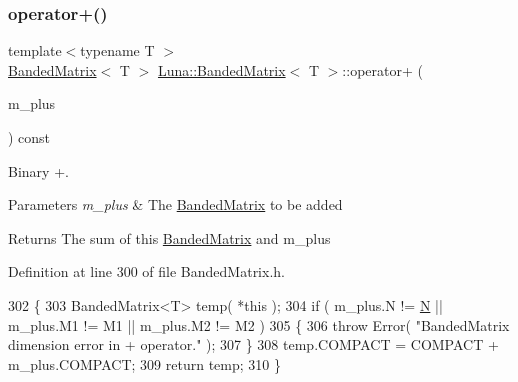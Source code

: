\subsubsection{\texorpdfstring{operator+()}{operator+()}\hspace{0.1cm}{\footnotesize\ttfamily [2/2]}}
{\footnotesize\ttfamily template$<$typename T $>$ \\
\hyperlink{classLuna_1_1BandedMatrix}{Banded\+Matrix}$<$ T $>$ \hyperlink{classLuna_1_1BandedMatrix}{Luna\+::\+Banded\+Matrix}$<$ T $>$\+::operator+ (\begin{DoxyParamCaption}\item[{const \hyperlink{classLuna_1_1BandedMatrix}{Banded\+Matrix}$<$ T $>$ \&}]{m\+\_\+plus }\end{DoxyParamCaption}) const\hspace{0.3cm}{\ttfamily [inline]}}



Binary +. 


\begin{DoxyParams}{Parameters}
{\em m\+\_\+plus} & The \hyperlink{classLuna_1_1BandedMatrix}{Banded\+Matrix} to be added \\
\hline
\end{DoxyParams}
\begin{DoxyReturn}{Returns}
The sum of this \hyperlink{classLuna_1_1BandedMatrix}{Banded\+Matrix} and m\+\_\+plus 
\end{DoxyReturn}


Definition at line 300 of file Banded\+Matrix.\+h.


\begin{DoxyCode}
302   \{
303     BandedMatrix<T> temp( *\textcolor{keyword}{this} );
304     \textcolor{keywordflow}{if} ( m\_plus.N != \hyperlink{namespaceHeat__plot_a7d050092798e28458a263710837bda77}{N} || m\_plus.M1 != M1 || m\_plus.M2 != M2  )
305     \{
306       \textcolor{keywordflow}{throw} Error( \textcolor{stringliteral}{"BandedMatrix dimension error in + operator."} );
307     \}
308     temp.COMPACT = COMPACT + m\_plus.COMPACT;
309     \textcolor{keywordflow}{return} temp;
310   \}
\end{DoxyCode}
\mbox{\label{classLuna_1_1BandedMatrix_a4d5dfdb90246620ca7d3f7abae766d01}} 
